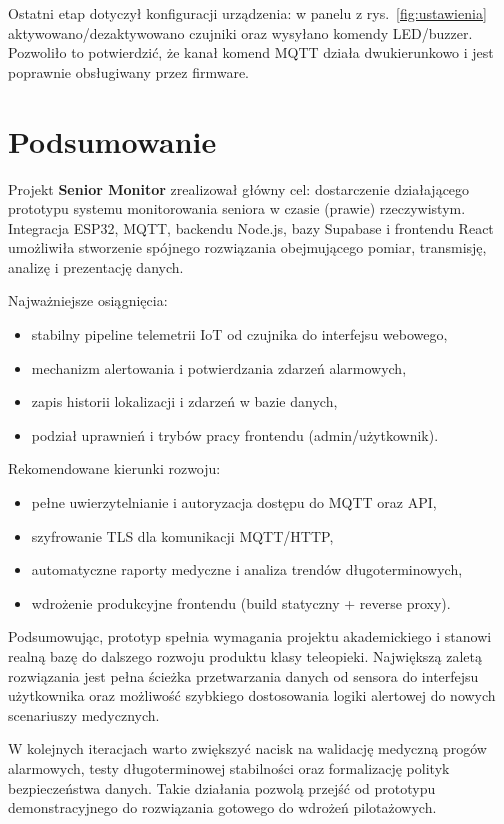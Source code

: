 \documentclass[a4paper,12pt]{article}
\begin{document}
Ostatni etap dotyczył konfiguracji urządzenia:
w panelu z rys.~\ref{fig:ustawienia} aktywowano/dezaktywowano czujniki oraz wysyłano komendy LED/buzzer.
Pozwoliło to potwierdzić, że kanał komend MQTT działa dwukierunkowo i jest poprawnie obsługiwany przez firmware.

\section{Podsumowanie}
Projekt \textbf{Senior Monitor} zrealizował główny cel: dostarczenie działającego prototypu systemu monitorowania seniora w czasie (prawie) rzeczywistym. Integracja ESP32, MQTT, backendu Node.js, bazy Supabase i frontendu React umożliwiła stworzenie spójnego rozwiązania obejmującego pomiar, transmisję, analizę i prezentację danych.

Najważniejsze osiągnięcia:
\begin{itemize}
  \item stabilny pipeline telemetrii IoT od czujnika do interfejsu webowego,
  \item mechanizm alertowania i potwierdzania zdarzeń alarmowych,
  \item zapis historii lokalizacji i zdarzeń w bazie danych,
  \item podział uprawnień i trybów pracy frontendu (admin/użytkownik).
\end{itemize}

Rekomendowane kierunki rozwoju:
\begin{itemize}
  \item pełne uwierzytelnianie i autoryzacja dostępu do MQTT oraz API,
  \item szyfrowanie TLS dla komunikacji MQTT/HTTP,
  \item automatyczne raporty medyczne i analiza trendów długoterminowych,
  \item wdrożenie produkcyjne frontendu (build statyczny + reverse proxy).
\end{itemize}

Podsumowując, prototyp spełnia wymagania projektu akademickiego i stanowi realną bazę do dalszego rozwoju produktu klasy teleopieki. Największą zaletą rozwiązania jest pełna ścieżka przetwarzania danych od sensora do interfejsu użytkownika oraz możliwość szybkiego dostosowania logiki alertowej do nowych scenariuszy medycznych.

W kolejnych iteracjach warto zwiększyć nacisk na walidację medyczną progów alarmowych, testy długoterminowej stabilności oraz formalizację polityk bezpieczeństwa danych. Takie działania pozwolą przejść od prototypu demonstracyjnego do rozwiązania gotowego do wdrożeń pilotażowych.
\end{document}
